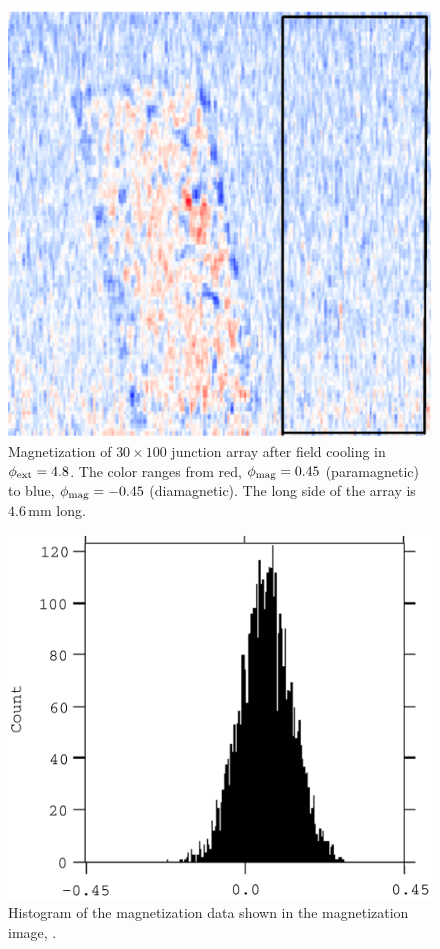 \begin{figure}[p]
\includegraphics[width=5.7in]{figs/pme_exp/fig3_6_a_lg.ps}
\caption[Magnetization of $30\times 100$ junction array after field
cooling in $\phiext = 4.8$.]
{Magnetization of $30\times 100$ junction array after field
cooling in $\phiext = 4.8$. The color 
ranges from red, $\phi_{\mathrm{mag}} = 0.45$ (paramagnetic) 
to blue, $\phi_{\mathrm{mag}} = -0.45$ (diamagnetic). The long side of the array
is $4.6\,\mathrm{mm}$ long. }
\label{fig:paramag_image_a}
\end{figure}

\begin{figure}[p]
\includegraphics[width=5.7in]{figs/pme_exp/fig3_6_b_lg.ps}
\caption{Histogram of the magnetization data shown
in the magnetization image, .}
\label{fig:paramag_image_b}
\end{figure}

